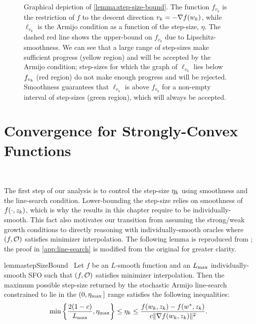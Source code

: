 \begin{figure}[t]
    \centering
    
    \caption[Step-size intervals accepted and rejected by the Armijo line-search for a Lipschitz-smooth function.]%
       {Graphical depiction of \autoref{lemma:step-size-bound}.
        The function \( f_{v_k} \) is the restriction of \( f \) to the descent direction \( v_k = -\grad(\wk) \), while \( \ell_{v_k} \) is the Armijo condition as a function of the step-size, \( \eta \).
        The dashed red line shows the upper-bound on \( f_{v_k} \) due to Lipschitz-smoothness.
        We can see that a large range of step-sizes make sufficient progress (yellow region) and will be accepted by the Armijo condition; step-sizes for which the graph of \( \ell_{v_k} \) lies below \( f_{\vk} \) (red region) do not make enough progress and will be rejected. 
        Smoothness guarantees that \( \ell_{v_k} \) is above \( f_{v_k} \) for a non-empty interval of step-sizes (green region), which will always be accepted.%
    }%
    \label{fig:step-size-bound}
\end{figure}

\section{Convergence for Strongly-Convex Functions}~\label{sec:ls-sc}

The first step of our analysis is to control the step-size \( \etak \) using smoothness and the line-search condition.
Lower-bounding the step-size relies on smoothness of \( f(\cdot, \zk) \), which is why the results in this chapter require \oracle{} to be individually-smooth. 
This fact also motivates our transition from assuming the strong/weak growth conditions to directly reasoning with individually-smooth oracles where \( \rbr{f, \oracle{}} \) satisfies minimizer interpolation.
The following lemma is reproduced from \citet{vaswani2019painless}; the proof in \autoref{app:line-search} is modified from the original for greater clarity. 
\begin{restatable}{lemma}{stepSizeBound}~\label{lemma:step-size-bound}
    Let \( f \) be an \( L \)-smooth function and \oracle{} an \( \Lmax \) individually-smooth \ac{SFO} such that \( \rbr{f, \oracle{}} \) satisfies minimizer interpolation. 
    Then the maximum possible step-size returned by the stochastic Armijo line-search constrained to lie in the \( (0, \etamax \, ] \) range satisfies the following inequalities:
    \[ \min\cbr{\frac{2 (1-c)}{\Lmax}, \etamax} \leq \etak \leq \frac{f(\wk, \zk) - f(\wopt, \zk)}{c \norm{\grad(\wk, \zk)}^2}. \]
\end{restatable}

